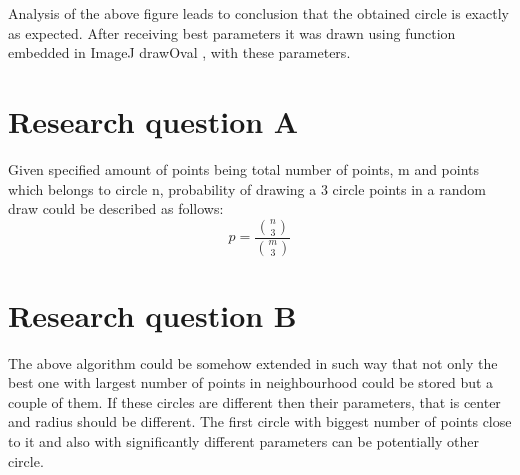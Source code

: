 \documentclass[notitlepage,english]{hgbreport}
\begin{document}
Analysis of the above figure leads to conclusion that the obtained circle is exactly as expected. After receiving best parameters it was drawn using function embedded in ImageJ drawOval , with these parameters.




\section {Research question A}

Given specified amount of points being total number of points, m and points which belongs to circle n, probability of drawing a 3 circle points in a random draw could be described as follows:
\[p=\frac{\binom{n}{3}}{\binom{m}{3}}\]


\section {Research question B}

The above algorithm could be somehow extended in such way that not only the best one with largest number of points in neighbourhood could be stored but a couple of them. If these circles are different then their parameters, that is center and radius should be different. The first circle with biggest number of points close to it and also with significantly different parameters can be potentially other circle. 


\MakeBibliography[nosplit]
\end{document}
